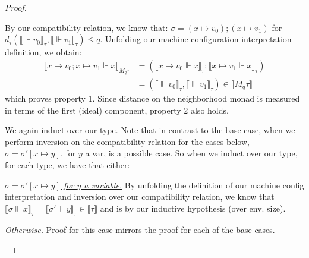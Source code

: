 \begin{proof}
\begin{description}
\begin{description}
\begin{description}
            By our compatibility relation, we know that: $\sigma = (x \mapsto
            v_0);(x \mapsto v_1)$ for $d_{\tau}(\llbracket \Vdash v_0
            \rrbracket_{\tau}, \llbracket \Vdash v_1 \rrbracket_{\tau}) \leq q$.
            Unfolding our machine configuration interpretation definition, we
            obtain:
            \begin{equation*}
              \begin{aligned}
                \llbracket x \mapsto v_0; x \mapsto v_1 \Vdash x \rrbracket_{M_q
                \tau} &= (\llbracket x \mapsto v_0 \Vdash x \rrbracket_{\tau};
                \llbracket x \mapsto v_1 \Vdash x \rrbracket_{\tau}) \\
                &= (\llbracket \Vdash v_0 \rrbracket_{\tau}, \llbracket \Vdash
                v_1 \rrbracket_{\tau}) \in \llbracket M_q \tau \rrbracket
              \end{aligned}
            \end{equation*}
            which proves property 1. Since distance on the neighborhood monad is
            measured in terms of the first (ideal) component, property 2 also
            holds.
        \end{description}
      \item[\textit{(env. size) n + 1.}] We again induct over our type. 
        Note that in contrast to the base case, when we perform inversion on the
        compatibility relation for the cases below, $\sigma = \sigma'[x \mapsto
        y]$, for $y$ a var, is a possible case. 
        So when we induct over our type, for each type, we have that either:
        \begin{description}
          \item{\underline{\textit{$\sigma = \sigma'[x \mapsto y]$ for $y$ a
            variable.}}} By unfolding the definition of our machine config
            interpretation and inversion over our compatibility relation, we
            know that $\llbracket \sigma \Vdash x \rrbracket_{\tau} = \llbracket
            \sigma' \Vdash y \rrbracket_{\tau} \in \llbracket \tau \rrbracket$
            and is  by our inductive hypothesis (over env.
            size).
          \item{\underline{\textit{Otherwise.}}} Proof for this case mirrors the
            proof for each of the base cases.
        \end{description}
    \end{description}
  \item[\textsc{(ty. rule) Ret.}] 

\end{description}
\end{proof}

